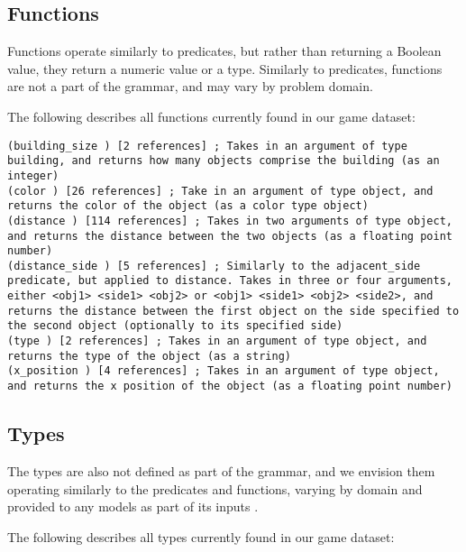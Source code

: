 \documentclass{article}
\begin{document}
\subsection{Functions} \label{sec:functions}
Functions operate similarly to predicates, but rather than returning a Boolean value, they return a numeric value or a type. 
Similarly to predicates, functions are not a part of the grammar, and may vary by problem domain. 

The following describes all functions currently found in our game dataset:
\begin{lstlisting}
(building_size ) [2 references] ; Takes in an argument of type building, and returns how many objects comprise the building (as an integer)
(color ) [26 references] ; Take in an argument of type object, and returns the color of the object (as a color type object)
(distance ) [114 references] ; Takes in two arguments of type object, and returns the distance between the two objects (as a floating point number)
(distance_side ) [5 references] ; Similarly to the adjacent_side predicate, but applied to distance. Takes in three or four arguments, either <obj1> <side1> <obj2> or <obj1> <side1> <obj2> <side2>, and returns the distance between the first object on the side specified to the second object (optionally to its specified side)
(type ) [2 references] ; Takes in an argument of type object, and returns the type of the object (as a string)
(x_position ) [4 references] ; Takes in an argument of type object, and returns the x position of the object (as a floating point number)
\end{lstlisting}



\subsection{Types} \label{sec:types}
The types are also not defined as part of the grammar, and we envision them operating similarly to the predicates and functions, varying by domain and provided to any models as part of its inputs .
            
The following describes all types currently found in our game dataset: 
        
\end{document}
